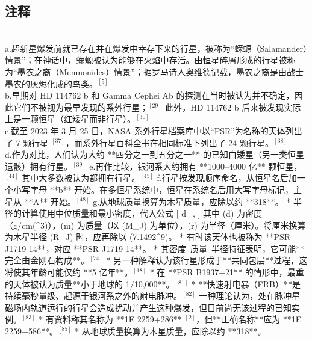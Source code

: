 \subsection{注释}\\
a.超新星爆发前就已存在并在爆发中幸存下来的行星，被称为“蝾螈（Salamander）情景”；在神话中，蝾螈被认为能够在火焰中存活。由恒星碎屑形成的行星被称为“墨农之裔（Memnonides）情景”；据罗马诗人奥维德记载，墨农之裔是由战士墨农的灰烬化成的鸟类。$^{[5]}$\\
b.早期对 HD 114762 b 和 Gamma Cephei Ab 的探测在当时被认为并不确定，因此它们不被视为最早发现的系外行星；$^{[29]}$ 此外，HD 114762 b 后来被发现实际上是一颗恒星（红矮星而非行星）。$^{[30]}$\\
c.截至 2023 年 3 月 25 日，NASA 系外行星档案库中以“PSR”为名称的天体列出了 7 颗行星 $^{[37]}$，而系外行星百科全书在相同标准下列出了 24 颗行星。$^{[38]}$\\
d.作为对比，人们认为大约 **四分之一到五分之一** 的已知白矮星（另一类恒星遗骸）拥有行星。$^{[39]}$
e.再作比较，银河系大约拥有 **1000–4000 亿** 颗恒星，$^{[44]}$ 其中大多数被认为都拥有行星。$^{[45]}$
f.行星按发现顺序命名，从恒星名后加一个小写字母 **b** 开始。在多恒星系统中，恒星在系统名后用大写字母标记，主星从 **A** 开始。$^{[48]}$
g.从地球质量换算为木星质量，应除以约 **318**。
* 半径的计算使用中位质量和最小密度，代入公式
  [
  d=,
  ]
  其中 (d) 为密度（g/cm(^3)），(m) 为质量（以 (M_J) 为单位），(r) 为半径（厘米）。将厘米换算为木星半径 (R_J) 时，应再除以 (7.1492^{9})。
* 有时该天体也被称为 **PSR J1719-14**，对应 **PSR J1719-14**。
* 其密度–质量–半径特征表明，它可能**完全由金刚石构成**。$^{[74]}$
* 另一种解释认为该行星形成于**共同包层**过程，这将使其年龄可能仅约 **5 亿年**。$^{[18]}$
* 在 **PSR B1937+21** 的情形中，最重的天体被认为质量**小于地球的 1/10,000**。$^{[81]}$
* **快速射电暴（FRB）**是持续毫秒量级、起源于银河系之外的射电脉冲。$^{[82]}$ 一种理论认为，处在脉冲星磁场内轨道运行的行星会造成扰动并产生这种爆发，但目前尚无该过程的已知实例。$^{[83]}$
* 有资料称其名称为 **1E 2259+286** $^{[2]}$，但**正确名称**应为 **1E 2259+586**。$^{[85]}$
* 从地球质量换算为木星质量，应除以约 **318**。
